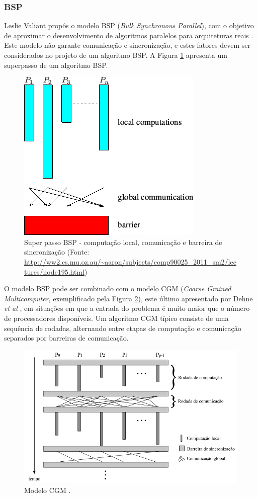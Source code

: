 \documentclass[a4paper, 12pt] {article}
\begin{document}
\subsubsection{BSP}

Leslie Valiant propôs o modelo BSP (\textit{Bulk Synchronous
Parallel}), com o objetivo de aproximar o
desenvolvimento de algoritmos paralelos para
arquiteturas reais \cite{Valiant:1990:BMP:79173.79181}. Este modelo não garante
comunicação e sincronização, e estes fatores devem ser considerados no projeto
de um algoritmo BSP. A Figura \ref{fig:bsp} apresenta um superpasso de um
algoritmo BSP.

\begin{figure}[ht]
\centering
\includegraphics[width=.4\textwidth]{bsp.png}
\caption{Super passo BSP - computação local, comunicação e barreira de
sincronização (Fonte:
\url{http://ww2.cs.mu.oz.au/~aaron/subjects/comp90025_2011_sm2/lectures/node195.html}) }
\label{fig:bsp}
\end{figure}

O modelo BSP pode ser combinado com o modelo CGM (\textit{Coarse Grained
Multicomputer}, exemplificado pela Figura \ref{fig:cgm}), este último
apresentado por Dehne \textit{et al} \cite{Dehne:1993:SPG:160985.161154}, em situações em que a entrada do problema é
muito maior que o número de processadores disponíveis. Um algoritmo CGM típico
consiste de uma sequência de rodadas, alternando entre etapas de computação e
comunicação separados por barreiras de comunicação.

\begin{figure}[ht]
\centering
\includegraphics[width=.6\textwidth]{cgm.png}
\caption{Modelo CGM \cite{loureiro2010}. }
\label{fig:cgm}
\end{figure}
\end{document}
